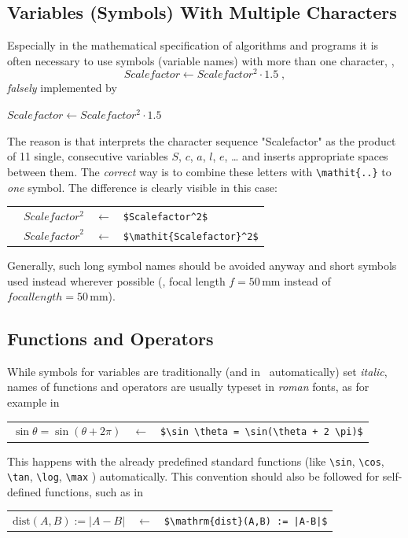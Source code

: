\subsection{Variables (Symbols) With Multiple Characters}

Especially in the mathematical specification of algorithms and programs
it is often necessary to use symbols (variable names) with more than one
character, \eg,
%
	\[Scalefactor\leftarrow Scalefactor^2 \cdot 1.5 \; ,\]
%
\emph{falsely} implemented by
%
\begin{LaTeXCode}[numbers=none]
$Scalefactor \leftarrow Scalefactor^2 \cdot 1.5$
\end{LaTeXCode}
%
The reason is that \latex interprets the character sequence "Scalefactor" as
the product of 11 single, consecutive variables $S$, $c$, $a$, $l$, $e$, \ldots
and inserts appropriate spaces between them.
The \emph{correct} way is to combine these letters with \verb!\mathit{..}! to 
\emph{one} symbol. The difference is clearly visible in this case:
%
\begin{center}
	\setlength{\tabcolsep}{4pt}
	\begin{tabular}{llll}
		\text{Wrong:}  & $Scalefactor^2$          & $\leftarrow$ &
		\verb!$Scalefactor^2$!          \\
		\text{Correct:} & $\mathit{Scalefactor}^2$ & $\leftarrow$ &
		\verb!$\mathit{Scalefactor}^2$!
	\end{tabular}
\end{center}
%
Generally, such long symbol names should be avoided anyway and short symbols
used instead wherever possible (\eg, focal length $f = 50 \, \mathrm{mm}$ 
instead of $\mathit{focal length} = 50 \, \mathrm{mm}$).


\subsection{Functions and Operators}

While symbols for variables are traditionally (and in \latex\ automatically)
set \emph{italic}, names of functions and operators are usually typeset in
\emph{roman} fonts, as for example in
%
\begin{center}
	\begin{tabular}{lcl}
		$\sin \theta = \sin(\theta + 2 \pi)$ &
		$\leftarrow$ & \verb!$\sin \theta = \sin(\theta + 2 \pi)$! \\
	\end{tabular}
\end{center}
%
This happens with the already predefined standard functions (like \verb!\sin!, 
\verb!\cos!, \verb!\tan!, \verb!\log!, \verb!\max! \uva) automatically.
This convention should also be followed for self-defined functions, such as in
%
\begin{center}
	\begin{tabular}{lcl}
	$\mathrm{dist}(A,B) := |A-B|$ & $\leftarrow$ & 
	\verb!$\mathrm{dist}(A,B) := |A-B|$! \\
	\end{tabular}
\end{center}


